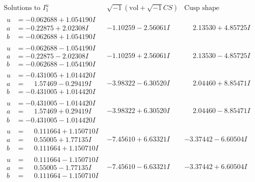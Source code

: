 \documentclass[1p]{elsarticle_modified}
\theoremstyle{definition}
\newcommand{\I}{\sqrt{-1}}
\begin{document}
$$\begin{array}{c|c|c}  
\text{Solutions to }I^u_{1}& \I (\text{vol} + \sqrt{-1}CS) & \text{Cusp shape}\\
 \hline 
\begin{aligned}
u &= -0.062688 + 1.054190 I \\
a &= -0.22875 + 2.02308 I \\
b &= -0.062688 + 1.054190 I\end{aligned}
 & -1.10259 - 2.56061 I & \phantom{-}2.13530 + 4.85725 I \\ \hline\begin{aligned}
u &= -0.062688 - 1.054190 I \\
a &= -0.22875 - 2.02308 I \\
b &= -0.062688 - 1.054190 I\end{aligned}
 & -1.10259 + 2.56061 I & \phantom{-}2.13530 - 4.85725 I \\ \hline\begin{aligned}
u &= -0.431005 + 1.014420 I \\
a &= \phantom{-}1.57469 - 0.29419 I \\
b &= -0.431005 + 1.014420 I\end{aligned}
 & -3.98322 - 6.30520 I & \phantom{-}2.04460 + 8.85471 I \\ \hline\begin{aligned}
u &= -0.431005 - 1.014420 I \\
a &= \phantom{-}1.57469 + 0.29419 I \\
b &= -0.431005 - 1.014420 I\end{aligned}
 & -3.98322 + 6.30520 I & \phantom{-}2.04460 - 8.85471 I \\ \hline\begin{aligned}
u &= \phantom{-}0.111664 + 1.150710 I \\
a &= \phantom{-}0.55005 + 1.77135 I \\
b &= \phantom{-}0.111664 + 1.150710 I\end{aligned}
 & -7.45610 + 6.63321 I & -3.37442 - 6.60504 I \\ \hline\begin{aligned}
u &= \phantom{-}0.111664 - 1.150710 I \\
a &= \phantom{-}0.55005 - 1.77135 I \\
b &= \phantom{-}0.111664 - 1.150710 I\end{aligned}
 & -7.45610 - 6.63321 I & -3.37442 + 6.60504 I \\ \hline\begin{aligned}

\end{aligned}
\end{array}$$
\end{document}
